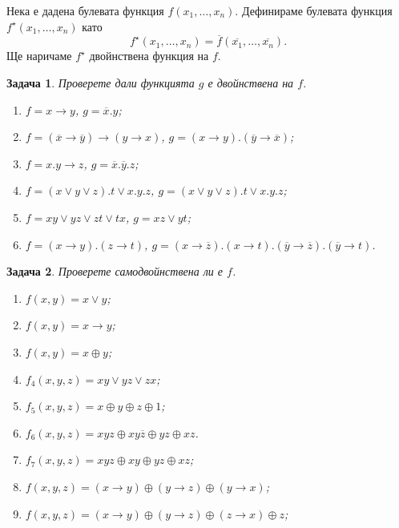 \documentclass[a4paper]{article}
\newtheorem{problem}{Задача}
\newcommand{\xn}{x_{1},\dots,x_{n}}
\newcommand{\ov}[1]{\overline{#1}}
\begin{document}
Нека е дадена булевата функция $f(\xn)$. Дефинираме булевата функция $f^\star(\xn)$ като
\[f^\star(\xn) = \overline{f}(\overline{x_1},\dots,\overline{x_n}).\]
Ще наричаме $f^\star$ двойнствена функция на $f$.

\begin{problem} %
  Проверете дали функцията $g$ е двойнствена на $f$.
  \begin{enumerate}[1)]
  \item
    $f = x\rightarrow y$, $g = \overline{x}.y$;
  \item
    $f = (\overline{x}\rightarrow\overline{y})\rightarrow(y\rightarrow x)$, $g = (x\rightarrow y).(\overline{y}\rightarrow\overline{x})$;
  \item
    $f = x.y \rightarrow z$, $g = \overline{x}.\overline{y}.z$;
  \item
    $f = (x\vee y\vee z).t\vee x.y.z$, $g = (x\vee y\vee z).t\vee x.y.z$;
  \item
    $f = xy\vee yz\vee zt\vee tx$, $g = xz\vee yt$;
  \item
    $f = (x\rightarrow y).(z\rightarrow t)$, $g = (x\rightarrow\overline{z}).(x\rightarrow t).(\overline{y}\rightarrow\overline{z}).(\overline{y}\rightarrow t)$.
  \end{enumerate}
\end{problem}

\begin{problem}
  Проверете самодвойнствена ли е $f$.
  \begin{enumerate}[1)]
  \item
    $f(x,y) = x\vee y$;
  \item
    $f(x,y) = x\rightarrow y$;
  \item
    $f(x,y) = x\oplus y$;
  \item
    $f_4(x,y,z) = xy\vee yz\vee zx$;
  \item
    $f_5(x,y,z) = x\oplus y\oplus z\oplus 1$;
  \item
    $f_6(x,y,z) = xyz\oplus xy\ov{z}\oplus yz\oplus xz$.
  \item
    $f_7(x,y,z) = xyz\oplus xy\oplus yz\oplus xz$;
  \item
    $f(x,y,z) = (x\rightarrow y)\oplus (y\rightarrow z)\oplus (y\rightarrow x)$;
  \item
    $f(x,y,z) = (x\rightarrow y)\oplus (y\rightarrow z)\oplus (z\rightarrow x)\oplus z$;
  \end{enumerate}
\end{problem}
\end{document}
